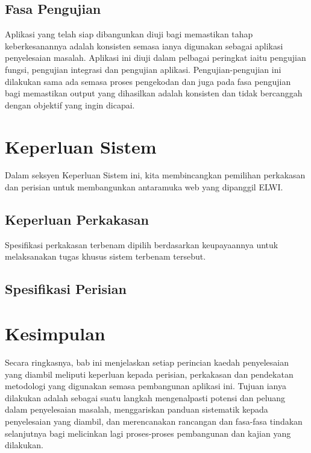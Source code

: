\subsection{Fasa Pengujian}
Aplikasi yang telah siap dibangunkan diuji bagi memastikan tahap keberkesanannya adalah konsisten semasa ianya digunakan sebagai aplikasi penyelesaian masalah. Aplikasi ini diuji dalam pelbagai peringkat iaitu pengujian fungsi, pengujian integrasi dan pengujian aplikasi. Pengujian-pengujian ini dilakukan sama ada semasa proses pengekodan dan juga pada fasa pengujian bagi memastikan output yang dihasilkan adalah konsisten dan tidak bercanggah dengan objektif yang ingin dicapai.

\section{Keperluan Sistem}
Dalam seksyen Keperluan Sistem ini, kita membincangkan pemilihan perkakasan dan perisian untuk membangunkan antaramuka web yang dipanggil ELWI.

\subsection{Keperluan Perkakasan}

Spesifikasi perkakasan terbenam dipilih berdasarkan keupayaannya untuk melaksanakan tugas khusus sistem terbenam tersebut.

\subsection{Spesifikasi Perisian}

\section{Kesimpulan}
Secara ringkasnya, bab ini menjelaskan setiap perincian kaedah penyelesaian yang diambil meliputi keperluan kepada perisian, perkakasan dan pendekatan metodologi yang digunakan semasa pembangunan aplikasi ini. Tujuan ianya dilakukan adalah sebagai suatu langkah mengenalpasti potensi dan peluang dalam penyelesaian masalah, menggariskan panduan sistematik kepada penyelesaian yang diambil, dan merencanakan rancangan dan fasa-fasa
tindakan selanjutnya bagi melicinkan lagi proses-proses pembangunan dan kajian yang dilakukan.
